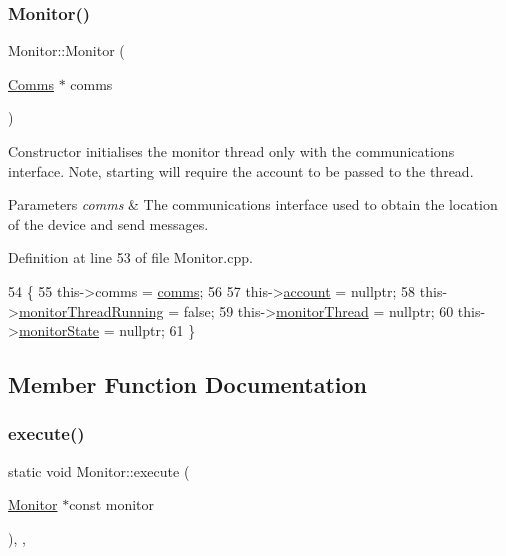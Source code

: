 \subsubsection{\texorpdfstring{Monitor()}{Monitor()}\hspace{0.1cm}{\footnotesize\ttfamily [2/2]}}
{\footnotesize\ttfamily Monitor\+::\+Monitor (\begin{DoxyParamCaption}\item[{\hyperlink{class_comms}{Comms} $\ast$}]{comms }\end{DoxyParamCaption})\hspace{0.3cm}{\ttfamily [explicit]}}

Constructor initialises the monitor thread only with the communications interface. Note, starting will require the account to be passed to the thread.


\begin{DoxyParams}{Parameters}
{\em comms} & The communications interface used to obtain the location of the device and send messages. \\
\hline
\end{DoxyParams}


Definition at line 53 of file Monitor.\+cpp.


\begin{DoxyCode}
54 \{
55     this->comms = \hyperlink{class_monitor_a42fffadeba33ae6080b1d95783ca703b}{comms};
56 
57     this->\hyperlink{class_monitor_acacff99178fbcd9eae50801acc346bf4}{account} = \textcolor{keyword}{nullptr};
58     this->\hyperlink{class_monitor_a63d26dffb146b9cfd0705163f3dc4745}{monitorThreadRunning} = \textcolor{keyword}{false};
59     this->\hyperlink{class_monitor_a1e6bfb7c47a223d8bdc537e2cff07822}{monitorThread} = \textcolor{keyword}{nullptr};
60     this->\hyperlink{class_monitor_a56b40e06ac7f2f36520e82ee01a17d4c}{monitorState} = \textcolor{keyword}{nullptr};
61 \}
\end{DoxyCode}


\subsection{Member Function Documentation}
\mbox{\label{class_monitor_a79e0c78d0973bee48418aedf3aedb2ba}} 
\subsubsection{\texorpdfstring{execute()}{execute()}}
{\footnotesize\ttfamily static void Monitor\+::execute (\begin{DoxyParamCaption}\item[{\hyperlink{class_monitor}{Monitor} $\ast$const}]{monitor }\end{DoxyParamCaption})\hspace{0.3cm}{\ttfamily [inline]}, {\ttfamily [static]}, {\ttfamily [private]}}



